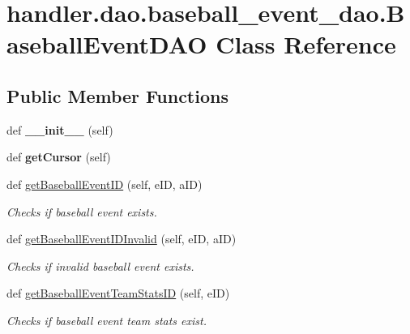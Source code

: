 \hypertarget{classhandler_1_1dao_1_1baseball__event__dao_1_1_baseball_event_d_a_o}{}\section{handler.\+dao.\+baseball\+\_\+event\+\_\+dao.\+Baseball\+Event\+D\+AO Class Reference}
\label{classhandler_1_1dao_1_1baseball__event__dao_1_1_baseball_event_d_a_o}
\subsection*{Public Member Functions}
\begin{DoxyCompactItemize}
\item 
\mbox{\label{classhandler_1_1dao_1_1baseball__event__dao_1_1_baseball_event_d_a_o_abf5511f2a7ce03a13dfc43be392da1e3}} 
def {\bfseries \+\_\+\+\_\+init\+\_\+\+\_\+} (self)
\item 
\mbox{\label{classhandler_1_1dao_1_1baseball__event__dao_1_1_baseball_event_d_a_o_a726340574ceb59a6d2e15305b907db41}} 
def {\bfseries get\+Cursor} (self)
\item 
def \hyperlink{classhandler_1_1dao_1_1baseball__event__dao_1_1_baseball_event_d_a_o_ab2535a0719ba0a98cc22a5bc2ec4eda3}{get\+Baseball\+Event\+ID} (self, e\+ID, a\+ID)
\begin{DoxyCompactList}\small\item\em Checks if baseball event exists. \end{DoxyCompactList}\item 
def \hyperlink{classhandler_1_1dao_1_1baseball__event__dao_1_1_baseball_event_d_a_o_a99e3b387e34c9d63c524f61567e3b9c2}{get\+Baseball\+Event\+I\+D\+Invalid} (self, e\+ID, a\+ID)
\begin{DoxyCompactList}\small\item\em Checks if invalid baseball event exists. \end{DoxyCompactList}\item 
def \hyperlink{classhandler_1_1dao_1_1baseball__event__dao_1_1_baseball_event_d_a_o_a27be92353deb42ef715531749e4202e2}{get\+Baseball\+Event\+Team\+Stats\+ID} (self, e\+ID)
\begin{DoxyCompactList}\small\item\em Checks if baseball event team stats exist. \end{DoxyCompactList}\item 

\end{DoxyCompactItemize}
